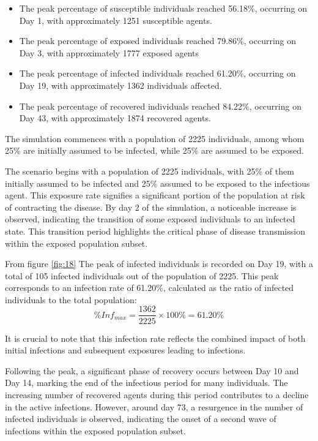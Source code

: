 \begin{itemize}
	
	\item The peak percentage of susceptible individuals reached 56.18\%, occurring on Day 1, with approximately 1251 susceptible agents.
	\item The peak percentage of exposed individuals reached 79.86\%, occurring on Day 3, with approximately 1777 exposed agents
	\item The peak percentage of infected individuals reached 61.20\%, occurring on Day 19, with approximately 1362 individuals affected.
	\item The peak percentage of recovered individuals reached 84.22\%, occurring on Day 43, with approximately 1874 recovered agents. 
\end{itemize}

The simulation commences with a population of 2225 individuals, among whom 25\% are initially assumed to be infected, while 25\% are assumed to be exposed. 

The scenario begins with a population of 2225 individuals, with 25\% of them initially assumed to be infected and 25\% assumed to be exposed to the infectious agent. This exposure rate signifies a significant portion of the population at risk of contracting the disease. By day 2 of the simulation, a noticeable increase is observed, indicating the transition of some exposed individuals to an infected state. This transition period highlights the critical phase of disease transmission within the exposed population subset.

From figure \ref{fig:18} The peak of infected individuals is recorded on Day 19, with a total of 105 infected individuals out of the population of 2225. This peak corresponds to an infection rate of 61.20\%, calculated as the ratio of infected individuals to the total population:
\[ \%Inf_{max} = \frac{1362}{2225} \times 100\%  = 61.20\% \]

It is crucial to note that this infection rate reflects the combined impact of both initial infections and subsequent exposures leading to infections. 

Following the peak, a significant phase of recovery occurs between Day 10 and Day 14, marking the end of the infectious period for many individuals. The increasing number of recovered agents during this period contributes to a decline in the active infections. However, around day 73, a resurgence in the number of infected individuals is observed, indicating the onset of a second wave of infections within the exposed population subset.

